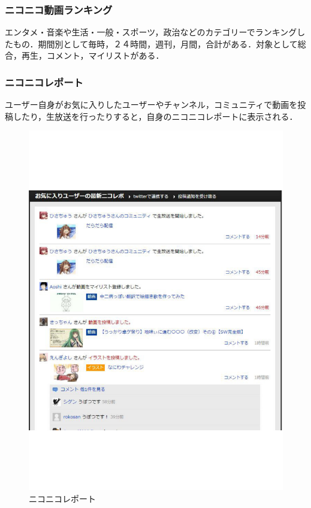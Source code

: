 \subsubsection*{ニコニコ動画ランキング}
エンタメ・音楽や生活・一般・スポーツ，政治などのカテゴリーでランキングしたもの．期間別として毎時，２４時間，週刊，月間，合計がある．対象として総合，再生，コメント，マイリストがある．

\subsubsection*{ニコニコレポート}
ユーザー自身がお気に入りしたユーザーやチャンネル，コミュニティで動画を投稿したり，生放送を行ったりすると，自身のニコニコレポートに表示される．

\begin{figure}[htb]
\centering
\includegraphics[width=14cm]{nikorepo.pdf}
\caption{ニコニコレポート}\label{nikorepo}
\end{figure}

